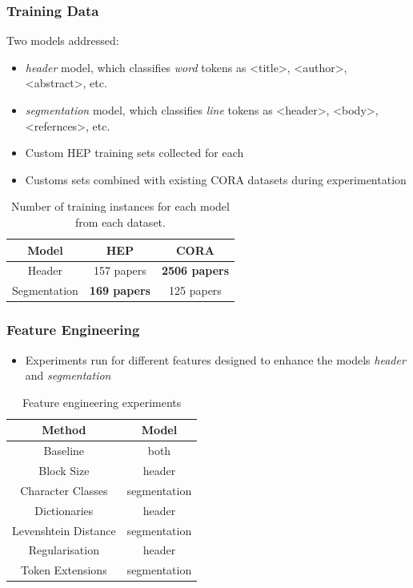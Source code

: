 \documentclass{beamer}
\begin{document}
\begin{frame}
\frametitle{Training Data}

Two models addressed:
\begin{itemize}
\item \emph{header} model, which classifies \emph{word} tokens as <title>, <author>, <abstract>, etc.
\item \emph{segmentation} model, which classifies \emph{line} tokens as <header>, <body>, <refernces>, etc.
\item Custom HEP training sets collected for each
\item Customs sets combined with existing CORA datasets during experimentation

\end{itemize}

\begin{table}[h]
\begin{center}
\begin{tabular}{|c|c|c|}
\hline
Model & HEP & CORA \\
\hline
Header & 157 papers & \textbf{2506 papers} \\
\hline
Segmentation & \textbf{169 papers} & 125 papers \\
\hline
\end{tabular}
\caption[Number of training instances for each model from each dataset.]{Number of training instances for each model from each dataset.}
\end{center}
\end{table}
\end{frame}


\begin{frame}
\frametitle{Feature Engineering}

\begin{itemize}
\item Experiments run for different features designed to enhance the models \emph{header} and \emph{segmentation}
\end{itemize}

\begin{table}[h]
\begin{center}
\begin{tabular}{|c|c|}
\hline
Method & Model \\
\hline
Baseline & both \\
\hline
Block Size & {header} \\
\hline
Character Classes & {segmentation} \\
\hline
Dictionaries & {header} \\
\hline
Levenshtein Distance & {segmentation} \\
\hline
Regularisation & {header} \\
\hline
Token Extensions & {segmentation} \\
\hline
\end{tabular}
\caption[]{Feature engineering experiments}
\end{center}
\end{table}
\end{frame}
\end{document}
